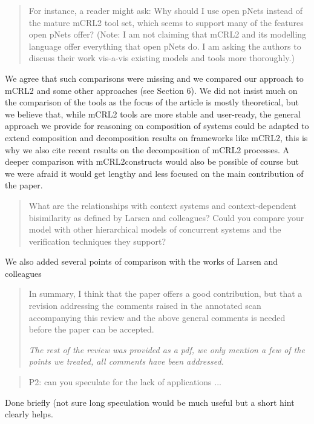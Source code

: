 \documentclass[10pt]{article}
\newenvironment{review}{\bgroup\itshape\begin{quote}}{\end{quote}\egroup}
\begin{document}
\begin{review}
For instance, a reader might ask: Why should I use open pNets instead of the mature mCRL2 tool set, which seems to support many of the features open pNets offer? (Note: I am not claiming that mCRL2 and its modelling language offer everything that open pNets
do. I am asking the authors to discuss their work vis-a-vis existing models and tools more thoroughly.) 
\end{review}
We agree that such comparisons were missing and we compared our approach to mCRL2 and some other approaches (see Section 6). We did not insist much on the comparison of the tools as the focus of the article is mostly theoretical, but we believe that, while mCRL2 tools are more stable and user-ready, the general approach we provide for reasoning on composition of systems could be adapted to extend composition and decomposition results on frameworks like mCRL2, this is why we also cite recent results on the decomposition of mCRL2 processes. A deeper comparison with mCRL2constructs  would also be possible of course but we were afraid it would get lengthy and less focused on the main contribution of the paper.

\begin{review}
What are the relationships with context systems and context-dependent bisimilarity as defined by Larsen and colleagues? Could you compare your model with other hierarchical models of concurrent systems and the verification techniques they support?
\end{review}
We also added several points of comparison with the works of Larsen and colleagues

\begin{review}

In summary, I think that the paper offers a good contribution, but that a revision addressing the comments raised in the annotated scan accompanying this review and the above general comments is needed before the paper can be accepted.

\emph{The rest of the review was provided as a pdf, we only mention a few of the points we treated, all comments have been addressed.}
\end{review}

\begin{review}
P2: can you speculate for the lack of applications ...
\end{review}
Done briefly (not sure long speculation would be much useful but a short hint clearly helps.
\end{document}
